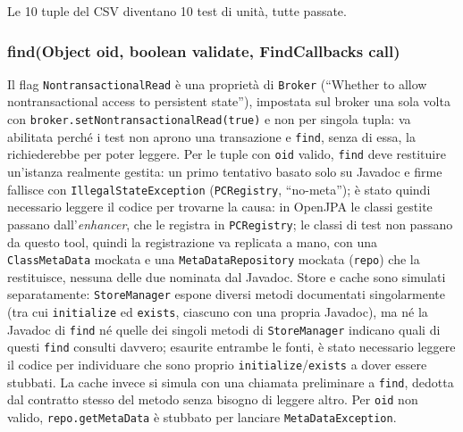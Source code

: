 Le 10 tuple del CSV diventano 10 test di unità, tutte passate.

\subsubsection{find(Object oid, boolean validate, FindCallbacks call)}

Il flag \texttt{NontransactionalRead} è una proprietà di \texttt{Broker} (``Whether to allow
nontransactional access to persistent state''), impostata sul broker una sola volta con
\texttt{broker.setNontransactionalRead(true)} e non per singola tupla: va abilitata perché i test
non aprono una transazione e \texttt{find}, senza di essa, la richiederebbe per poter leggere. Per
le tuple con \texttt{oid} valido, \texttt{find} deve restituire un'istanza realmente gestita: un
primo tentativo basato solo su Javadoc e firme fallisce con \texttt{IllegalStateException}
(\texttt{PCRegistry}, ``no-meta''); è stato quindi necessario leggere il codice per trovarne la
causa: in OpenJPA le classi gestite
passano dall'\textit{enhancer}, che le registra in \texttt{PCRegistry}; le classi di test non
passano da questo tool, quindi la registrazione va replicata a mano, con una
\texttt{ClassMetaData} mockata e una \texttt{MetaDataRepository} mockata (\texttt{repo}) che la
restituisce, nessuna delle due nominata dal Javadoc. Store e cache sono simulati separatamente:
\texttt{StoreManager} espone diversi metodi documentati singolarmente (tra cui
\texttt{initialize} ed \texttt{exists}, ciascuno con una propria Javadoc), ma né la Javadoc di
\texttt{find} né quelle dei singoli metodi di \texttt{StoreManager} indicano quali di questi
\texttt{find} consulti davvero; esaurite entrambe le fonti, è stato necessario leggere il codice
per individuare che sono proprio \texttt{initialize}/\texttt{exists} a dover essere stubbati. La
cache invece si simula con una chiamata preliminare a \texttt{find}, dedotta dal contratto stesso
del metodo senza bisogno di leggere altro. Per
\texttt{oid} non valido, \texttt{repo.getMetaData} è stubbato per lanciare
\texttt{MetaDataException}.

